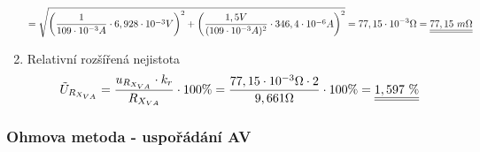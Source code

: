 \documentclass[a4paper, czech]{article}
\begin{document}
\begin{enumerate}
\begin{multline*}
        = \sqrt{\left(\frac{1}{109 \cdot 10^{-3}A} \cdot 6,928 \cdot 10^{-3} V\right)^2 + \left(\frac{1,5V}{(109 \cdot 10^{-3}A)^2} \cdot 346,4 \cdot 10^{-6} A\right)^2} = 77,15 \cdot 10^{-3} \Omega = \underline{\underline{77,15\ m \Omega}} \hfill
    \end{multline*}
    \item Relativní rozšířená nejistota
    \begin{multline*}
        \tilde{U}_{R_{X_{VA}}} = \frac{u_{R_{X_{VA}}} \cdot k_r}{R_{X_{VA}}} \cdot 100\% = \frac{77,15 \cdot 10^{-3} \Omega \cdot 2}{9,661 \Omega} \cdot 100\% = \underline{\underline{1,597\ \%}} \hfill
    \end{multline*}
\end{enumerate}

\subsubsection{Ohmova metoda - uspořádání AV}
\end{document}
